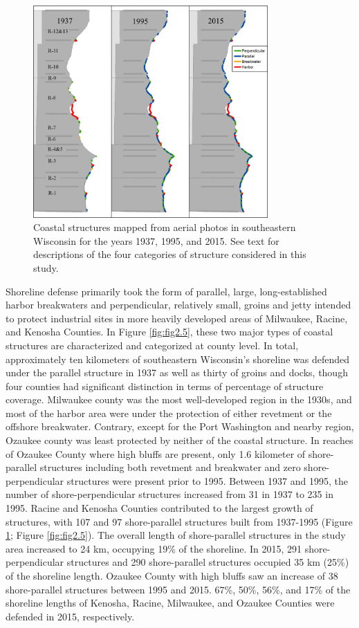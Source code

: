 \begin{figure}[htbp] \centering
\includegraphics[width=0.8\textwidth]{chapter2/resources/figure2-4.jpg}
\caption{Coastal structures mapped from aerial photos in southeastern Wisconsin
for the years 1937, 1995, and 2015. See text for descriptions of the four
categories of structure considered in this study.} \label{fig:fig2.4}
\end{figure}

Shoreline defense primarily took the form of parallel, large, long-established
harbor breakwaters and perpendicular, relatively small, groins and jetty
intended to protect industrial sites in more heavily developed areas of
Milwaukee, Racine, and Kenosha Counties. In Figure \ref{fig:fig2.5}, these two
major types of coastal structures are characterized and categorized at county
level. In total, approximately ten kilometers of southeastern Wisconsin’s
shoreline was defended under the parallel structure in 1937 as well as thirty of
groins and docks, though four counties had significant distinction in terms of
percentage of structure coverage. Milwaukee county was the most well-developed
region in the 1930s, and most of the harbor area were under the protection of
either revetment or the offshore breakwater. Contrary, except for the Port
Washington and nearby region, Ozaukee county was least protected by neither of
the coastal structure. In reaches of Ozaukee County where high bluffs are
present, only 1.6 kilometer of shore-parallel structures including both
revetment and breakwater and zero shore-perpendicular structures were present
prior to 1995.  Between 1937 and 1995, the number of shore-perpendicular
structures increased from 31 in 1937 to 235 in 1995. Racine and Kenosha Counties
contributed to the largest growth of structures, with 107 and 97 shore-parallel
structures built from 1937-1995 (Figure \ref{fig:fig2.4}; Figure
\ref{fig:fig2.5}). The overall length of shore-parallel structures in the study
area increased to 24 km, occupying 19\% of the shoreline. In 2015, 291
shore-perpendicular structures and 290 shore-parallel structures occupied 35 km
(25\%) of the shoreline length. Ozaukee County with high bluffs saw an increase
of 38 shore-parallel structures between 1995 and 2015. 67\%, 50\%, 56\%, and
17\% of the shoreline lengths of Kenosha, Racine, Milwaukee, and Ozaukee
Counties were defended in 2015, respectively.  

